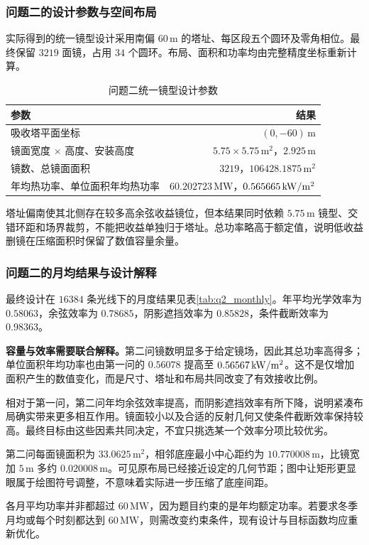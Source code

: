 \subsubsection{问题二的设计参数与空间布局}
实际得到的统一镜型设计采用南偏 $60\,\mathrm m$ 的塔址、每区段五个圆环及零角相位。最终保留 $3219$ 面镜，占用 $34$ 个圆环。布局、面积和功率均由完整精度坐标重新计算。
\begin{table}[H]\centering\small
\caption{问题二统一镜型设计参数}
\begin{tabular}{lr}\toprule
参数 & 结果\\\midrule
吸收塔平面坐标 & $(0,-60)\,\mathrm m$\\
镜面宽度 $\times$ 高度、安装高度 & $5.75\times5.75\,\mathrm m^2$，$2.925\,\mathrm m$\\
镜数、总镜面面积 & $3219$，$106428.1875\,\mathrm m^2$\\
年均热功率、单位面积年均热功率 & $60.202723\,\mathrm{MW}$，$0.565665\,\mathrm{kW}/\mathrm{m}^2$\\
\bottomrule\end{tabular}\end{table}
塔址偏南使其北侧存在较多高余弦收益镜位，但本结果同时依赖 $5.75\,\mathrm m$ 镜型、交错环距和场界裁剪，不能把收益单独归于塔址。总功率略高于额定值，说明低收益删镜在压缩面积时保留了数值容量余量。

\pagepart
\subsubsection{问题二的月均结果与设计解释}
最终设计在 $16384$ 条光线下的月度结果见表\ref{tab:q2_monthly}。年平均光学效率为 $0.58063$，余弦效率为 $0.78685$，阴影遮挡效率为 $0.85828$，条件截断效率为 $0.98363$。

\textbf{容量与效率需要联合解释。}第二问镜数明显多于给定镜场，因此其总功率高得多；单位面积年均功率也由第一问的 $0.56078$ 提高至 $0.56567\,\mathrm{kW}/\mathrm{m}^2$。这不是仅增加面积产生的数值变化，而是尺寸、塔址和布局共同改变了有效接收比例。

相对于第一问，第二问年均余弦效率提高，而阴影遮挡效率有所下降，说明紧凑布局确实带来更多相互作用。镜面较小以及合适的反射几何又使条件截断效率保持较高。最终目标由这些因素共同决定，不宜只挑选某一个效率分项比较优劣。

第二问每面镜面积为 $33.0625\,\mathrm m^2$，相邻底座最小中心距约为 $10.770008\,\mathrm m$，比镜宽加 $5\,\mathrm m$ 多约 $0.020008\,\mathrm m$。可见原布局已经接近设定的几何节距；图中让矩形更显眼属于绘图符号调整，不意味着实际进一步压缩了底座间距。

各月平均功率并非都超过 $60\,\mathrm{MW}$，因为题目约束的是年均额定功率。若要求冬季月均或每个时刻都达到 $60\,\mathrm{MW}$，则需改变约束条件，现有设计与目标函数均应重新优化。
\pagepart
